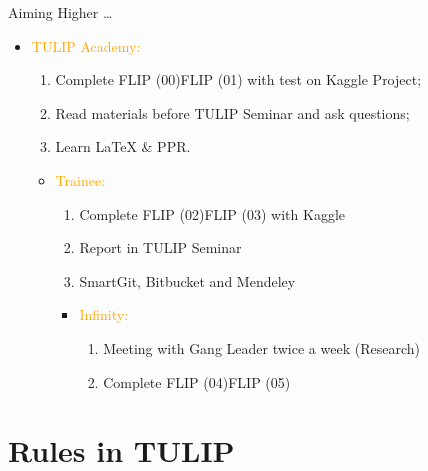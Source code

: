 \documentclass[
 size=14pt,
 paper=smartboard,  %
 mode=present, 		%
 display=slides, 	%
 style=tuliplab,  	%
 pauseslide,
 fleqn,leqno]{powerdot}
\begin{document}
\begin{slide}{Aiming Higher \dots}
    \begin{itemize}
      \item \textcolor{orange}{TULIP Academy:}
       \begin{enumerate}
         \item Complete FLIP (00)\texttildelow FLIP (01) with test on Kaggle Project;
         \item Read materials before TULIP Seminar and ask questions;
         \item Learn \LaTeX{} \& PPR.
       \end{enumerate}
       \begin{itemize}
         \item \textcolor{orange}{Trainee:}
         \begin{enumerate}
           \item Complete  FLIP (02)\texttildelow FLIP (03) with Kaggle
           \item Report in TULIP Seminar
           \item SmartGit, Bitbucket and Mendeley
         \end{enumerate}
         \begin{itemize}
           \item \textcolor{orange}{Infinity:}
            \begin{enumerate}
              \item Meeting with Gang Leader twice a week (Research)
              \item Complete  FLIP (04)\texttildelow FLIP (05)
            \end{enumerate}
         \end{itemize}
       \end{itemize}

    \end{itemize}
\end{slide}


\section{Rules in TULIP}
\end{document}
